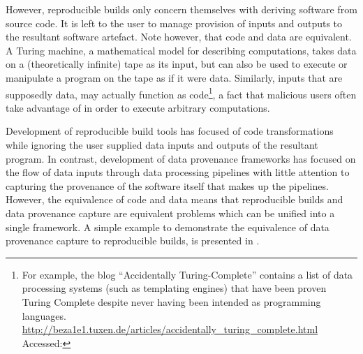 However, reproducible builds only concern themselves with deriving software from source code. It is left to the user to manage provision of inputs and outputs to the resultant software artefact. Note however, that code and data are equivalent. A Turing machine, a mathematical model for describing computations, takes data on a (theoretically infinite) tape as its input, but can also be used to execute or manipulate a program on the tape as if it were data. Similarly, inputs that are supposedly data, may actually function as code\footnote{For example, the blog ``Accidentally Turing-Complete'' contains a list of data processing systems (such as templating engines) that have been proven Turing Complete despite never having been intended as programming languages. \url{http://beza1e1.tuxen.de/articles/accidentally_turing_complete.html} Accessed: }, a fact that malicious users often take advantage of in order to execute arbitrary computations.

Development of reproducible build tools has focused of code transformations while ignoring the user supplied data inputs and outputs of the resultant program. In contrast, development of data provenance frameworks has focused on the flow of data inputs through data processing pipelines with little attention to capturing the provenance of the software itself that makes up the pipelines. However, the equivalence of code and data means that reproducible builds and data provenance capture are equivalent problems which can be unified into a single framework. A simple example to demonstrate the equivalence of data provenance capture to reproducible builds, is presented in .




